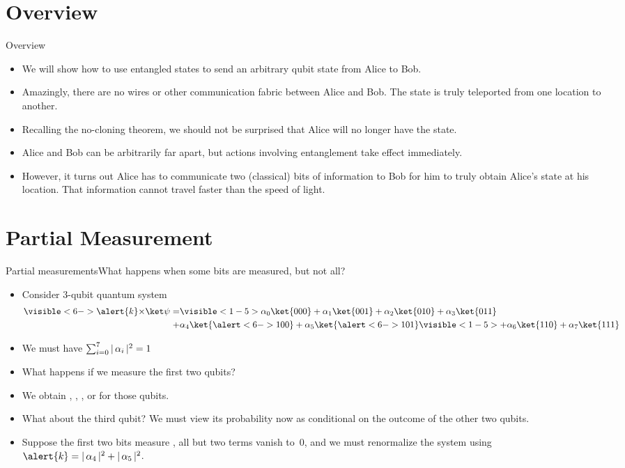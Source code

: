 
\section*{Overview}
\begin{frame}{Overview}
    \begin{itemize}[<+->]
        \item We will show how to use entangled states to send an arbitrary qubit state from Alice to Bob.
        \item Amazingly, there are no wires or other communication fabric between Alice and Bob.  The state is truly teleported from one location to another.
        \item Recalling the no-cloning theorem, we should not be surprised that Alice will no longer have the state.
        \item Alice and Bob can be arbitrarily far apart, but actions involving entanglement take effect immediately.
        \item However, it turns out Alice has to communicate two (classical) bits of information to Bob for him to truly obtain Alice's state at his location.  That information cannot travel faster than the speed of light.
    \end{itemize}
\end{frame}

\section*{Partial Measurement}

\begin{frame}{Partial measurements}{What happens when some bits are measured, but not all?}
\begin{itemize}[<+->]
    \item Consider 3-qubit quantum system
    \begin{align*}
  \visible<6->{\alert{k} \times }\QState{\relax}
   = & \visible<1-5>{\alpha_{0} \ket{000}
  +  \alpha_{1} \ket{001}
  +  \alpha_{2} \ket{010}
  +  \alpha_{3} \ket{011} }\\
  +  & \alpha_{4} \ket{\alert<6->{10}0}
  +  \alpha_{5} \ket{\alert<6->{10}1}
 \visible<1-5>{ +  \alpha_{6} \ket{110}
  +  \alpha_{7} \ket{111}}
    \end{align*}
    \item We must have $\sum_{i=0}^{7} |\,\alpha_{i}\,|^{2} = 1$
    \item What happens if we measure the first two qubits? 
    \item We obtain , , , or  for those qubits.
    \item What about the third qubit?  We must view its probability now as conditional on the outcome of the other two qubits.
    \item Suppose the first two bits measure , all but two terms vanish to~$0$, and we must renormalize the system using $\alert{k}=\Prob{\alpha_4} + \Prob{\alpha_5}$. 
\end{itemize}

    
\end{frame}

